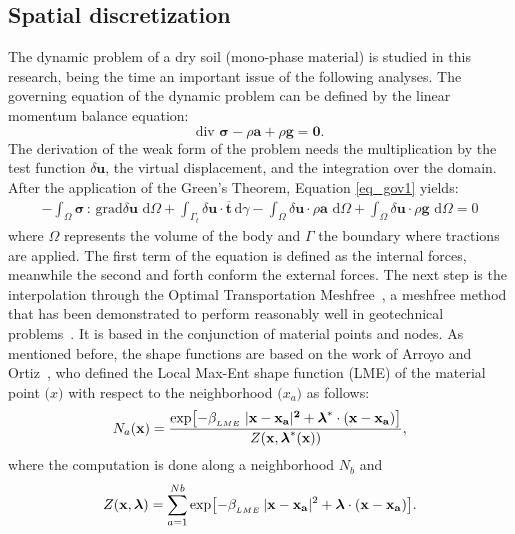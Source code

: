 \documentclass[applsci,journal,article,submit,moreauthors,pdftex]{Definitions/mdpi}
\newcommand{\differential}[1]
{\mathrm{d}#1}
\begin{document}
\subsection{Spatial discretization}
The dynamic problem of a dry soil (mono-phase material) is studied in this research, being the time an important issue of the following analyses. The governing equation of the dynamic problem can be defined by the linear momentum balance equation:
\begin{equation}\label{eq_gov1}
 \mbox{div } \boldsymbol{\sigma}-\rho\boldsymbol{a}+\rho\boldsymbol{g}=\boldsymbol{0}.
\end{equation}
The derivation of the weak form of the problem needs the multiplication by the test function $\delta \boldsymbol{u}$, the virtual displacement, and the integration over the domain. After the application of the Green's Theorem, Equation \eqref{eq_gov1} yields:
\begin{eqnarray} \label{eq_gov1_a}
-\int_\Omega \boldsymbol{ \sigma} \, : \, \mbox{grad} \delta\boldsymbol{u} \,\, \differential{\Omega} + \int_{\Gamma_{t}} \delta\boldsymbol{u} \cdot\boldsymbol{\overline{t}} \, \differential \gamma - \int_\Omega \delta\boldsymbol{u} \cdot  \rho\boldsymbol{a}  \,\, \differential{\Omega} + \int_\Omega \delta\boldsymbol{u} \cdot 
\rho\boldsymbol{g}  \,\, \differential{\Omega}= 0 
\end{eqnarray}
where $\Omega$ represents the volume of the body and $\Gamma$ the boundary where tractions are applied. The first term of the equation is defined as the internal forces, meanwhile the second and forth conform the external forces. The next step is the interpolation through the Optimal Transportation Meshfree~\cite{li2010,li2014,Huang2019}, a meshfree method that has been demonstrated to perform reasonably well in geotechnical problems~\cite{Navas2020,Navas2021}. It is based in the conjunction of material points and nodes. As mentioned before, the shape functions are based on the work of Arroyo and Ortiz~\cite{arroyo2006}, who defined the Local Max-Ent shape function (LME) of the material point $\boldsymbol(x)$ with respect to the neighborhood $\boldsymbol(x_a)$ as follows:
\begin{equation} \label{eq_N1}
N_a(\textbf{x})=\frac{\exp\left[ -\beta_{_{LME}} \; |\bf{x-x_a}|^2 +  \boldsymbol{\lambda}^*  \cdot  (x-x_a)  \right] } {Z(\textbf{x},\boldsymbol{\lambda}^*(\textbf{x}))},
\end{equation}
where the computation is done along a neighborhood $N_b$ and 
\begin{equation}\label{eq_N2}
Z({\bf x}, {\boldsymbol{\lambda}}) = \sum_{a=1}^{Nb} \exp \left[ -\beta_{_{LME}} \, |{\bf x-x_a}|^2 + \boldsymbol{\lambda}  \cdot  {\bf(x-x_a)}         \right].
\end{equation}
\end{document}
